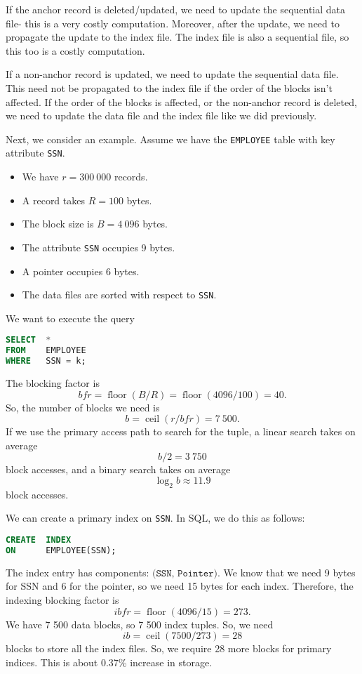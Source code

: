\documentclass[a4paper, openany]{memoir}
\begin{document}
If the anchor record is deleted/updated, we need to update the sequential data file- this is a very costly computation. Moreover, after the update, we need to propagate the update to the index file. The index file is also a sequential file, so this too is a costly computation.

If a non-anchor record is updated, we need to update the sequential data file. This need not be propagated to the index file if the order of the blocks isn't affected. If the order of the blocks is affected, or the non-anchor record is deleted, we need to update the data file and the index file like we did previously.

Next, we consider an example. Assume we have the \texttt{EMPLOYEE} table with key attribute \texttt{SSN}.
\begin{itemize}
    \item We have $r = 300 \ 000$ records.
    \item A record takes $R = 100$ bytes.
    \item The block size is $B = 4 \ 096$ bytes.
    \item The attribute \texttt{SSN} occupies 9 bytes.
    \item A pointer occupies 6 bytes.
    \item The data files are sorted with respect to \texttt{SSN}.
\end{itemize}
We want to execute the query
\begin{lstlisting}[language=SQL]
SELECT  *
FROM    EMPLOYEE
WHERE   SSN = k;
\end{lstlisting}
The blocking factor is
\[\textit{bfr} = \operatorname{floor}(B/R) = \operatorname{floor}(4096/100) = 40.\]
So, the number of blocks we need is
\[b = \operatorname{ceil}(r/\textit{bfr}) = 7 \ 500.\]
If we use the primary access path to search for the tuple, a linear search takes on average
\[b/2 = 3 \ 750\]
block accesses, and a binary search takes on average
\[\log_2 b \approx 11.9\]
block accesses. 

We can create a primary index on \texttt{SSN}. In SQL, we do this as follows:
\begin{lstlisting}[language=SQL]
CREATE  INDEX
ON      EMPLOYEE(SSN);
\end{lstlisting}
The index entry has components: $\texttt{(SSN, Pointer)}$. We know that we need 9 bytes for SSN and 6 for the pointer, so we need 15 bytes for each index. Therefore, the indexing blocking factor is
\[\textit{ibfr} = \operatorname{floor}(4096/15) = 273.\]
We have 7 500 data blocks, so 7 500 index tuples. So, we need
\[\textit{ib} = \operatorname{ceil}(7500/273) = 28\]
blocks to store all the index files. So, we require 28 more blocks for primary indices. This is about 0.37\% increase in storage.
\end{document}
